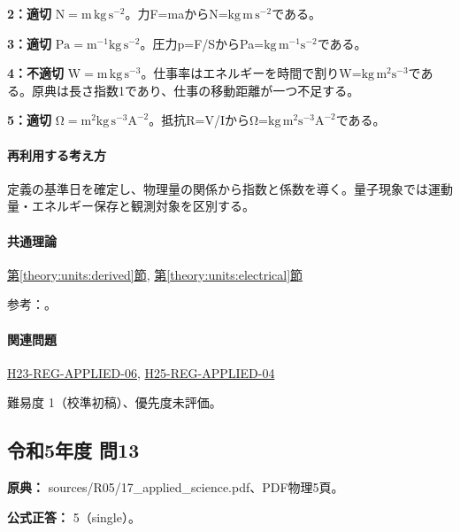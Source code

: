 \noindent\textbf{2：適切} \(\mathrm{N=m\,kg\,s^{-2}}\)。力F=\allowbreak{}maからN=\(\mathrm{kg\,m\,s^{-2}}\)である。\par

\noindent\textbf{3：適切} \(\mathrm{Pa=m^{-1}kg\,s^{-2}}\)。圧力p=\allowbreak{}F/SからPa=\(\mathrm{kg\,m^{-1}s^{-2}}\)である。\par

\noindent\textbf{4：不適切} \(\mathrm{W=m\,kg\,s^{-3}}\)。仕事率はエネルギーを時間で割りW=\(\mathrm{kg\,m^2s^{-3}}\)である。原典は長さ指数1であり、仕事の移動距離が一つ不足する。\par

\noindent\textbf{5：適切} \(\mathrm{\Omega=m^2kg\,s^{-3}A^{-2}}\)。抵抗R=\allowbreak{}V/IからΩ=\(\mathrm{kg\,m^2s^{-3}A^{-2}}\)である。\par

\paragraph{再利用する考え方} 定義の基準日を確定し、物理量の関係から指数と係数を導く。量子現象では運動量・エネルギー保存と観測対象を区別する。

\paragraph{共通理論} \hyperref[theory:units:derived]{第\ref*{theory:units:derived}節}, \hyperref[theory:units:electrical]{第\ref*{theory:units:electrical}節}

\par 参考：\cite{si_nist811,si_brochure9}。

\paragraph{関連問題} \hyperref[q:h23-reg-applied-06]{H23-REG-APPLIED-06}, \hyperref[q:h25-reg-applied-04]{H25-REG-APPLIED-04}

\par 難易度 1（校準初稿）、優先度未評価。

\subsection{令和5年度 問13}
\label{q:r05-reg-applied-13}

\noindent\textbf{原典：} sources/R05/17\_applied\_science.pdf、PDF物理5頁。

\textbf{公式正答：} 5（single）。

